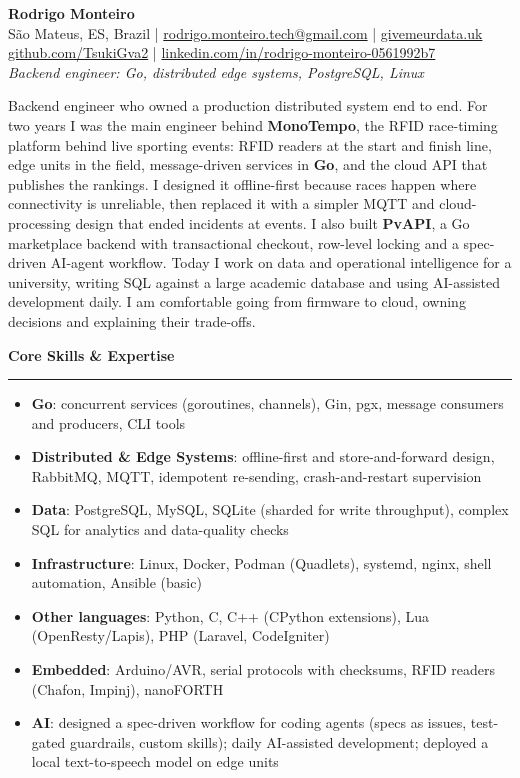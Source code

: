 \documentclass[a4paper,10pt]{article}
\newcommand{\sectiontitle}[1]{\needspace{5\baselineskip}\vspace{6pt}\noindent\textbf{\large #1}\vspace{3pt}\hrule\vspace{6pt}}
\begin{document}
	\begin{center}
		{\LARGE \textbf{Rodrigo Monteiro}}\\
		\vspace{2pt}
		São Mateus, ES, Brazil \quad | \quad \href{mailto:rodrigo.monteiro.tech@gmail.com}{rodrigo.monteiro.tech@gmail.com} \quad | \quad \href{https://givemeurdata.uk}{givemeurdata.uk} \\
		\href{https://github.com/TsukiGva2}{github.com/TsukiGva2} \quad | \quad
		\href{https://www.linkedin.com/in/rodrigo-monteiro-0561992b7/}{linkedin.com/in/rodrigo-monteiro-0561992b7} \\
		\vspace{2pt}
		\textit{Backend engineer: Go, distributed edge systems, PostgreSQL, Linux}
	\end{center}

	Backend engineer who owned a production distributed system end to end. For two years I was the main engineer behind \textbf{MonoTempo}, the RFID race-timing platform behind live sporting events: RFID readers at the start and finish line, edge units in the field, message-driven services in \textbf{Go}, and the cloud API that publishes the rankings. I designed it offline-first because races happen where connectivity is unreliable, then replaced it with a simpler MQTT and cloud-processing design that ended incidents at events. I also built \textbf{PvAPI}, a Go marketplace backend with transactional checkout, row-level locking and a spec-driven AI-agent workflow. Today I work on data and operational intelligence for a university, writing SQL against a large academic database and using \mbox{AI-assisted} development daily. I am comfortable going from firmware to cloud, owning decisions and explaining their trade-offs.

	\sectiontitle{Core Skills \& Expertise}
	\begin{itemize}
		\item \textbf{Go}: concurrent services (goroutines, channels), Gin, pgx, message consumers and producers, CLI tools
		\item \textbf{Distributed \& Edge Systems}: offline-first and store-and-forward design, RabbitMQ, MQTT, idempotent re-sending, crash-and-restart supervision
		\item \textbf{Data}: PostgreSQL, MySQL, SQLite (sharded for write throughput), complex SQL for analytics and data-quality checks
		\item \textbf{Infrastructure}: Linux, Docker, Podman (Quadlets), systemd, nginx, shell automation, Ansible (basic)
		\item \textbf{Other languages}: Python, C, C++ (CPython extensions), Lua (OpenResty/Lapis), PHP (Laravel, CodeIgniter)
		\item \textbf{Embedded}: Arduino/AVR, serial protocols with checksums, RFID readers (Chafon, Impinj), nanoFORTH
		\item \textbf{AI}: designed a spec-driven workflow for coding agents (specs as issues, test-gated guardrails, custom skills); daily \mbox{AI-assisted} development; deployed a local text-to-speech model on edge units
	\end{itemize}
\end{document}

